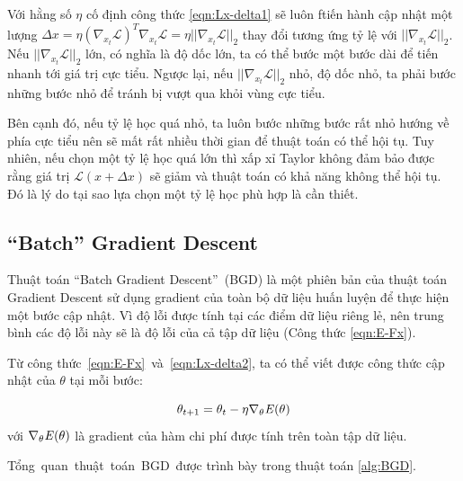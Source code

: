 Với hằng số $\eta$ cố định công thức \ref{eqn:Lx-delta1} sẽ luôn ftiến hành cập nhật một lượng $\Delta x = \eta (\nabla _{x_t}\mathcal{L})^T\nabla _{x_t}\mathcal{L} = \eta ||\nabla _{x_t}\mathcal{L}||_2$ thay đổi tương ứng tỷ lệ với $||\nabla _{x_t} \mathcal{L}||_2$. Nếu $||\nabla _{x_t} \mathcal{L}||_2$ lớn, có nghĩa là độ dốc lớn, ta có thể bước một bước dài để tiến nhanh tới giá trị cực tiểu. Ngược lại, nếu $||\nabla_{x_t} \mathcal{L}||_2$ nhỏ, độ dốc nhỏ, ta phải bước những bước nhỏ để tránh bị vượt qua khỏi vùng cực tiểu.

Bên cạnh đó, nếu tỷ lệ học quá nhỏ, ta luôn bước những bước rất nhỏ hướng về phía cực tiểu nên sẽ mất rất nhiều thời gian để thuật toán có thể hội tụ. Tuy nhiên, nếu chọn một tỷ lệ học quá lớn thì xấp xỉ Taylor không đảm bảo được rằng giá trị $\mathcal{L}(x + \Delta x)$ sẽ giảm và thuật toán có khả năng không thể hội tụ. Đó là lý do tại sao lựa chọn một tỷ lệ học phù hợp là cần thiết.

\subsection{``Batch'' Gradient Descent}

Thuật toán ``Batch Gradient Descent'' (BGD) là một phiên bản của thuật toán Gradient Descent sử dụng gradient của toàn bộ dữ liệu huấn luyện để thực hiện một bước cập nhật. Vì độ lỗi được tính tại các điểm dữ liệu riêng lẻ, nên trung bình các độ lỗi này sẽ là độ lỗi của cả tập dữ liệu (Công thức \ref{eqn:E-Fx}).

Từ công thức \ref{eqn:E-Fx} và \ref{eqn:Lx-delta2}, ta có thể viết được công thức cập nhật của $\theta$ tại mỗi bước:

\begin{equation}
	\label{eqn:theta-batch-update}
	\theta_{t+1} = \theta_ t - \eta \nabla_{\theta} \mathbf{\it{E}(\theta)}
\end{equation}
với $\nabla_\theta \mathbf{\it{E}(\theta)}$ là gradient của hàm chi phí được tính trên toàn tập dữ liệu.

Tổng quan thuật toán BGD được trình bày trong thuật toán \ref{alg:BGD}.

